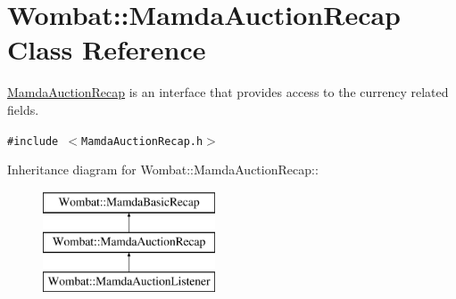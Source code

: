 \hypertarget{classWombat_1_1MamdaAuctionRecap}{
\section{Wombat::Mamda\-Auction\-Recap Class Reference}
\label{classWombat_1_1MamdaAuctionRecap}
}
\hyperlink{classWombat_1_1MamdaAuctionRecap}{Mamda\-Auction\-Recap} is an interface that provides access to the currency related fields.  


{\tt \#include $<$Mamda\-Auction\-Recap.h$>$}

Inheritance diagram for Wombat::Mamda\-Auction\-Recap::\begin{figure}[H]
\begin{center}
\leavevmode
\includegraphics[height=3cm]{classWombat_1_1MamdaAuctionRecap}
\end{center}
\end{figure}
